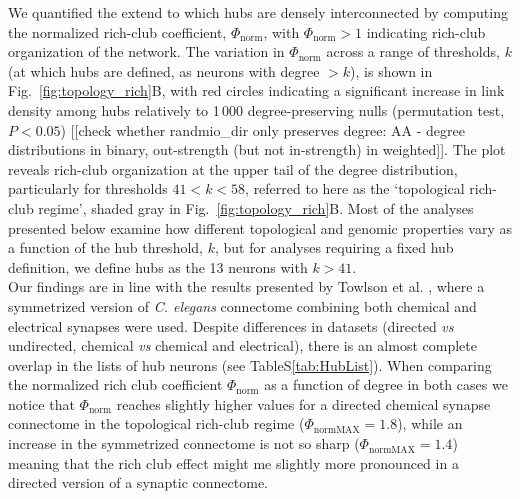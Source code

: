 \documentclass[10pt,letterpaper]{article}
\begin{document}
We quantified the extend to which hubs are densely interconnected by computing the normalized rich-club coefficient, $\Phi_\mathrm{norm}$, with $\Phi_\mathrm{norm} > 1$ indicating rich-club organization of the network.
The variation in $\Phi_\mathrm{norm}$ across a range of thresholds, $k$ (at which hubs are defined, as neurons with degree $>k$), is shown in Fig.~\ref{fig:topology_rich}B, with red circles indicating a significant increase in link density among hubs relatively to 1\,000 degree-preserving nulls (permutation test, $P < 0.05$) [[check whether randmio\_dir only preserves degree: AA - degree distributions in binary, out-strength (but not in-strength) in weighted]].
The plot reveals rich-club organization at the upper tail of the degree distribution, particularly for thresholds $41 < k < 58$, referred to here as the `topological rich-club regime', shaded gray in Fig.~\ref{fig:topology_rich}B.
Most of the analyses presented below examine how different topological and genomic properties vary as a function of the hub threshold, $k$, but for analyses requiring a fixed hub definition, we define hubs as the 13 neurons with $k > 41$.\\
Our findings are in line with the results presented by Towlson et al. \cite{Towlson2013}, where a symmetrized version of \textit{C. elegans} connectome combining both chemical and electrical synapses were used. 
Despite differences in datasets (directed \textit{vs} undirected, chemical \textit{vs} chemical and electrical), there is an almost complete overlap in the lists of hub neurons (see TableS\ref{tab:HubList}). 
When comparing the normalized rich club coefficient $\Phi_\mathrm{norm}$ as a function of degree in both cases we notice that $\Phi_\mathrm{norm}$ reaches slightly higher values for a directed chemical synapse connectome in the topological rich-club regime ($\Phi_\mathrm{normMAX} = 1.8$), while an increase in the symmetrized connectome is not so sharp ($\Phi_\mathrm{normMAX} = 1.4$) meaning that the  rich club effect might me slightly more pronounced in a directed version of a synaptic connectome. 
\end{document}
